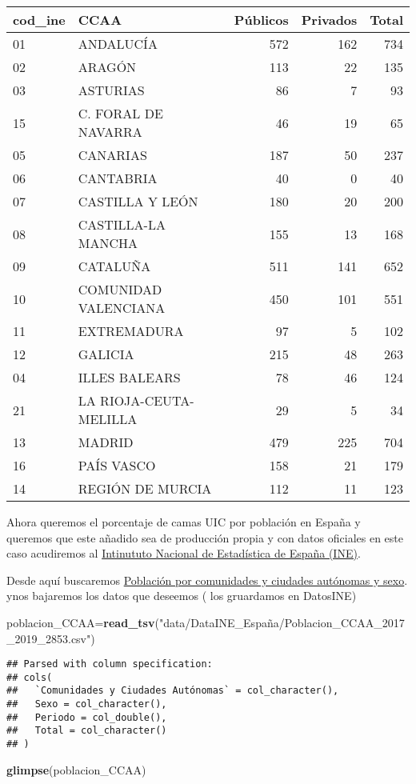 \documentclass[
]{article}
\newenvironment{Shaded}{\begin{snugshade}}{\end{snugshade}}
\newcommand{\KeywordTok}[1]{\textcolor[rgb]{0.13,0.29,0.53}{\textbf{#1}}}
\newcommand{\NormalTok}[1]{#1}
\newcommand{\StringTok}[1]{\textcolor[rgb]{0.31,0.60,0.02}{#1}}
\begin{document}
\begin{longtable}[]{@{}llrrr@{}}
\toprule
cod\_ine & CCAA & Públicos & Privados & Total\tabularnewline
\midrule
\endhead
01 & ANDALUCÍA & 572 & 162 & 734\tabularnewline
02 & ARAGÓN & 113 & 22 & 135\tabularnewline
03 & ASTURIAS & 86 & 7 & 93\tabularnewline
15 & C. FORAL DE NAVARRA & 46 & 19 & 65\tabularnewline
05 & CANARIAS & 187 & 50 & 237\tabularnewline
06 & CANTABRIA & 40 & 0 & 40\tabularnewline
07 & CASTILLA Y LEÓN & 180 & 20 & 200\tabularnewline
08 & CASTILLA-LA MANCHA & 155 & 13 & 168\tabularnewline
09 & CATALUÑA & 511 & 141 & 652\tabularnewline
10 & COMUNIDAD VALENCIANA & 450 & 101 & 551\tabularnewline
11 & EXTREMADURA & 97 & 5 & 102\tabularnewline
12 & GALICIA & 215 & 48 & 263\tabularnewline
04 & ILLES BALEARS & 78 & 46 & 124\tabularnewline
21 & LA RIOJA-CEUTA-MELILLA & 29 & 5 & 34\tabularnewline
13 & MADRID & 479 & 225 & 704\tabularnewline
16 & PAÍS VASCO & 158 & 21 & 179\tabularnewline
14 & REGIÓN DE MURCIA & 112 & 11 & 123\tabularnewline
\bottomrule
\end{longtable}

Ahora queremos el porcentaje de camas UIC por población en España y
queremos que este añadido sea de producción propia y con datos oficiales
en este caso acudiremos al \href{ine.es}{Intinututo Nacional de
Estadística de España (INE)}.

Desde aquí buscaremos
\href{https://www.ine.es/jaxiT3/Tabla.htm?t=2853}{Población por
comunidades y ciudades autónomas y sexo}. ynos bajaremos los datos que
deseemos ( los gruardamos en DatosINE)

\begin{Shaded}
\begin{Highlighting}[]
\NormalTok{poblacion_CCAA=}\KeywordTok{read_tsv}\NormalTok{(}\StringTok{"data/DataINE_España/Poblacion_CCAA_2017_2019_2853.csv"}\NormalTok{)}
\end{Highlighting}
\end{Shaded}

\begin{verbatim}
## Parsed with column specification:
## cols(
##   `Comunidades y Ciudades Autónomas` = col_character(),
##   Sexo = col_character(),
##   Periodo = col_double(),
##   Total = col_character()
## )
\end{verbatim}

\begin{Shaded}
\begin{Highlighting}[]
\KeywordTok{glimpse}\NormalTok{(poblacion_CCAA)}
\end{Highlighting}
\end{Shaded}
\end{document}

